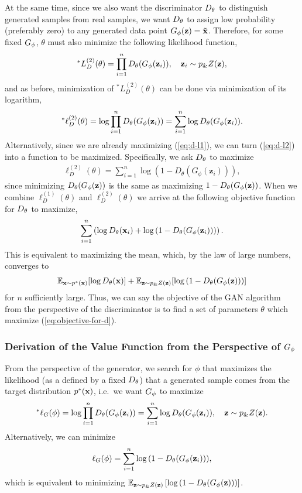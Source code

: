At the same time, since we also want the discriminator $D_\theta$ to
distinguish generated samples from real samples, we want $D_\theta$ to
assign low probability (preferably zero) to any generated data point
$G_\phi(\mathbf{z}) = \tilde{\mathbf{x}}$.  Therefore, for some fixed $G_\phi$, $\theta$
must also minimize the following likelihood function,
\begin{align} ^*L_{D}^{(2)}(\theta) = \prod_{i=1}^n D_\theta(G_\phi(\mathbf{z}_i)),
  \quad \mathbf{z}_i \sim p_\&Z(\mathbf{z}),
\end{align} and as before, minimization of $^*L_{D}^{(2)}(\theta)$ can
be done via minimization of its logarithm,
\begin{align}
  \label{eq:d-l2} ^*\ell_{D}^{(2)}(\theta) = \log \prod_{i=1}^n
  D_\theta(G_\phi(\mathbf{z}_i)) = \sum_{i=1}^n \log D_\theta (G_\phi(\mathbf{z}_i)).
\end{align} Alternatively, since we are already maximizing
(\ref{eq:d-l1}), we can turn (\ref{eq:d-l2}) into a function to be
maximized. Specifically, we ask $D_\theta$ to maximize
\begin{align} \ell_{D}^{(2)}(\theta) = \sum_{i=1}^n \log{(1 -
    D_\theta(G_\phi(\mathbf{z}_i)))},
\end{align} since minimizing $D_\theta(G_\phi(\mathbf{z}))$ is the same as maximizing
$1 - D_\theta(G_\phi(\mathbf{z}))$. When we combine $\ell_{D}^{(1)}(\theta)$ and
$\ell_{D}^{(2)}(\theta)$ we arrive at the following objective function
for $D_\theta$ to maximize,
\begin{align} \sum_{i=1}^n \left( \log D_\theta(\mathbf{x}_i) + \log{(1 -
      D_\theta(G_\phi(\mathbf{z}_i)))} \right).
\end{align} This is equivalent to maximizing the mean, which, by the
law of large numbers, converges to
\begin{align}
  \label{eq:objective-for-d} \mathbb{E}_{\mathbf{x} \sim p^*(\mathbf{x})}[{\log D_\theta(\mathbf{x}})]
  + \mathbb{E}_{\mathbf{z} \sim p_\&Z(\mathbf{z})}[\log{(1 - D_\theta(G_\phi(\mathbf{z})))}]
\end{align} for $n$ sufficiently large. Thus, we can say the objective
of the GAN algorithm from the perspective of the discriminator is to
find a set of parameters $\theta$ which maximize
(\ref{eq:objective-for-d}).

\subsubsection{Derivation of the Value Function from the Perspective
  of $G_\phi$}
\label{sec:derivation-g}

From the perspective of the generator, we search for $\phi$ that
maximizes the likelihood (as a defined by a fixed $D_\theta$) that a
generated sample comes from the target distribution $p^*(\mathbf{x})$, i.e.\ we
want $G_\phi$ to maximize
\begin{align} ^*\ell_G(\phi) = \log\prod_{i=1}^nD_\theta(G_\phi(\mathbf{z}_i)) =
  \sum_{i=1}^n\log{D_\theta(G_\phi(\mathbf{z}_i))}, \quad \mathbf{z} \sim p_\&Z(\mathbf{z}).
\end{align}
Alternatively, we can minimize
\begin{align}
  \ell_G(\phi) = \sum_{i=1}^n\log{(1 - D_\theta(G_\phi(\mathbf{z}_i)))},
\end{align}
which is equivalent to minimizing $\mathbb{E}_{\mathbf{z} \sim p_\&Z(\mathbf{z})} \left[\log{(1 - D_\theta(G_\phi(\mathbf{z})))} \right]$.

